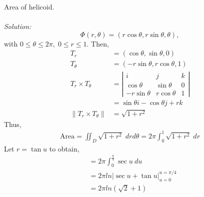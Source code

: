 \documentclass[12pt]{book}
\theoremstyle{definition}
\theoremstyle{remark}
\newcommand\sol{%
  \\ 
  \\
  \textit{Solution:}\\%
}
\begin{document}
\begin{example} Area of helicoid. 
  \sol 
  $$\Phi(r, \theta) = (r \cos \theta , r \sin \theta, \theta), $$
  with $0 \leq \theta \leq 2 \pi ,\; 0 \leq r \leq 1.$ Then, 
  \begin{equation*}
    \begin{split}
      T_r &= ( \cos \theta , \sin \theta , 0  ) \\ 
      T_\theta &= ( -r\sin \theta , r \cos \theta , 1 ) \\ 
      T_r \times T_\theta &= \left| \begin{matrix}
        i& j& k \\ \cos \theta & \sin \theta & 0 \\ -r\sin \theta & r \cos \theta & 1 
      \end{matrix}  \right| \\ 
      & = \sin \theta i - \cos \theta j + r k \\ 
      \|T_r \times T_\theta \| &= \sqrt{ 1 + r^2 }
    \end{split}
  \end{equation*}
  Thus, 
  \begin{equation*}
    \begin{split}
      \text{Area} = \iint_D \sqrt{1 + r^2} \; dr d\theta = 2 \pi \int_0 ^1 \sqrt{ 1 + r^2 } \; dr 
    \end{split}
  \end{equation*}
  Let $r = \tan u$ to obtain, 
  \begin{equation*}
    \begin{split}
      &= 2 \pi \int_{{0}}^{{\frac{\pi}{4} }} {\sec u} \: d{u} \\ 
      &= 2 \pi ln | \sec u + \tan u |_{u=0}^{u = \pi /4 }\\ 
      &= 2 \pi ln ( \sqrt 2 + 1 )
    \end{split}
  \end{equation*}
\end{example}
\end{document}
